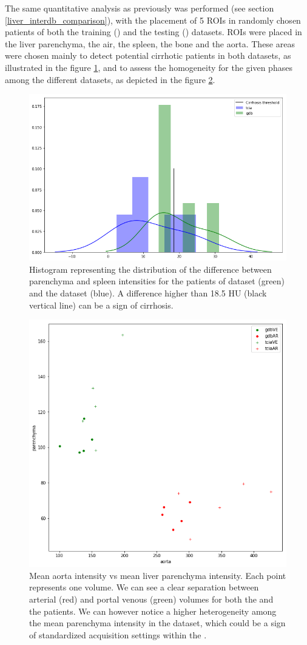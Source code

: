 The same quantitative analysis as previously was performed (see section \ref{liver_interdb_comparison}), with the placement of 5 ROIs in randomly chosen patients of both the training (\textbf{}) and the testing (\textbf{}) datasets. ROIs were placed in the liver parenchyma, the air, the spleen, the bone and the aorta. These areas were chosen mainly to detect potential cirrhotic patients in both datasets, as illustrated in the figure \ref{fig:cirrhoticPatPlot}, and to assess the homogeneity for the given phases among the different datasets, as depicted in the figure \ref{fig:gdbAortaPlot}. 
\begin{figure}[!ht]
	\centering
	\includegraphics[width=0.6\linewidth]{../Contributions/images/Gdb_TCIA_cirrhosisPlot_bins5}
	\caption{Histogram representing the distribution of the difference between parenchyma and spleen intensities for the patients of  \textbf{} dataset (green) and the  \textbf{} dataset (blue). A difference higher than 18.5 HU (black vertical line) can be a sign of cirrhosis.
	}
	\label{fig:cirrhoticPatPlot}
\end{figure}
\begin{figure}[!ht]
	\centering
	\includegraphics[width=0.6\linewidth]{../Contributions/images/AortaParPlot_Gdb_2}
	\caption{Mean aorta intensity vs mean liver parenchyma intensity. Each point represents one volume. We can see a clear separation between arterial (red) and portal venous (green) volumes for both the \textbf{} and the \textbf{} patients. We can however notice a higher heterogeneity among the mean parenchyma intensity in the \textbf{} dataset, which could be a sign of standardized acquisition settings within the \textbf{}.
	}
	\label{fig:gdbAortaPlot}
\end{figure}


